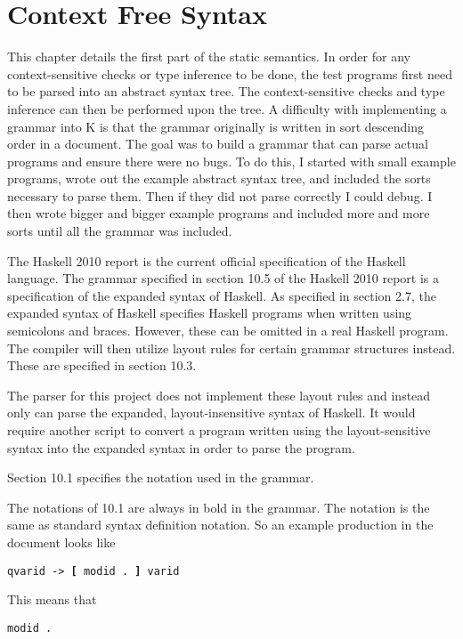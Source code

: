 \chapter{Context Free Syntax}
This chapter details the first part of the static semantics. In order for any context-sensitive checks or type inference to be done, the test programs first need to be parsed into an abstract syntax tree. The context-sensitive checks and type inference can then be performed upon the tree.
A difficulty with implementing a grammar into K is that the grammar originally is written in sort descending order in a document. The goal was to build a grammar that can parse actual programs and ensure there were no bugs. To do this, I started with small example programs, wrote out the example abstract syntax tree, and included the sorts necessary to parse them. Then if they did not parse correctly I could debug. I then wrote bigger and bigger example programs and included more and more sorts until all the grammar was included.

The Haskell 2010 report \cite{Report:Report} is the current official specification of the Haskell language. The grammar specified in section 10.5 of the Haskell 2010 report is a specification of the expanded syntax of Haskell. As specified in section 2.7, the expanded syntax of Haskell specifies Haskell programs when written using semicolons and braces. However, these can be omitted in a real Haskell program. The compiler will then utilize layout rules for certain grammar structures instead. These are specified in section 10.3.

The parser for this project does not implement these layout rules and instead only can parse the expanded, layout-insensitive syntax of Haskell. It would require another script to convert a program written using the layout-sensitive syntax into the expanded syntax in order to parse the program.

Section 10.1 \cite{Report:Report} specifies the notation used in the grammar.

The notations of 10.1 are always in bold in the grammar. The notation is the same as standard syntax definition notation.
So an example production in the document looks like

\texttt{qvarid -> \textbf{[} modid . \textbf{]} varid}

\noindent
This means that 

\begin{lstlisting}
modid .
\end{lstlisting}

